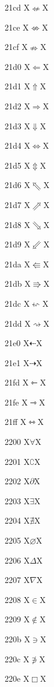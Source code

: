 \documentclass[11pt]{article}
\begin{document}
21cd X{\ensuremath{\nLeftarrow}}X

21ce X{\ensuremath{\nLeftrightarrow}}X

21cf X{\ensuremath{\nRightarrow}}X

21d0 X{\ensuremath{\Leftarrow}}X

21d1 X{\ensuremath{\Uparrow}}X

21d2 X{\ensuremath{\Rightarrow}}X

21d3 X{\ensuremath{\Downarrow}}X

21d4 X{\ensuremath{\Leftrightarrow}}X

21d5 X{\ensuremath{\Updownarrow}}X

21d6 X{\ensuremath{\Nwarrow}}X

21d7 X{\ensuremath{\Nearrow}}X

21d8 X{\ensuremath{\Searrow}}X

21d9 X{\ensuremath{\Swarrow}}X

21da X{\ensuremath{\Lleftarrow}}X

21db X{\ensuremath{\Rrightarrow}}X

21dc X{\ensuremath{\leftsquigarrow}}X

21dd X{\ensuremath{\rightsquigarrow}}X

21e0 X{\ensuremath{\dashleftarrow}}X

21e1 X{\ensuremath{\dashrightarrow}}X

21fd X{\ensuremath{\leftarrowtriangle}}X

21fe X{\ensuremath{\rightarrowtriangle}}X

21ff X{\ensuremath{\leftrightarrowtriangle}}X

2200 X{\ensuremath{\forall}}X

2201 X{\ensuremath{\complement}}X

2202 X{\ensuremath{\partial}}X

2203 X{\ensuremath{\exists}}X

2204 X{\ensuremath{\nexists}}X

2205 X{\ensuremath{\varnothing}}X

2206 X{\ensuremath{\Delta}}X

2207 X{\ensuremath{\nabla}}X

2208 X{\ensuremath{\in}}X

2209 X{\ensuremath{\notin}}X

220b X{\ensuremath{\ni}}X

220c X{\ensuremath{\notni}}X

220e X{\ensuremath{\Box}}X
\end{document}
